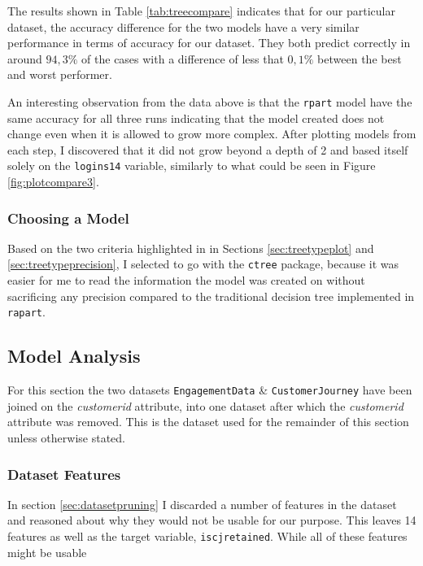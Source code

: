 The results shown in Table \ref{tab:treecompare} indicates that for our
particular dataset, the accuracy difference for the two models have a very
similar performance in terms of accuracy for our dataset. They both predict
correctly in around $94,3\%$ of the cases with a difference of less that
$0,1\%$ between the best and worst performer.

An interesting observation from the data above is that the \texttt{rpart} model
have the same accuracy for all three runs indicating that the model created does
not change even when it is allowed to grow more complex. After plotting models
from each step, I discovered that it did not grow beyond a depth of 2 and based
itself solely on the \texttt{logins14} variable, similarly to what could be seen
in Figure \ref{fig:plotcompare3}.


\subsubsection{Choosing a Model}

Based on the two criteria highlighted in in Sections \ref{sec:treetypeplot} and
\ref{sec:treetypeprecision}, I selected to go with the \texttt{ctree} package,
because it was easier for me to read the information the model was created on
without sacrificing any precision compared to the traditional decision tree
implemented in \texttt{rapart}.


\subsection{Model Analysis}

For this section the two datasets \texttt{EngagementData} \&
\texttt{CustomerJourney} have been joined on the \textit{customerid} attribute,
into one dataset after which the \textit{customerid} attribute was removed. This
is the dataset used for the remainder of this section unless otherwise stated.


\subsubsection{Dataset Features}

In section \ref{sec:datasetpruning} I discarded a number of features in the
dataset and reasoned about why they would not be usable for our purpose. This
leaves 14 features as well as the target variable, \texttt{iscjretained}. While
all of these features might be usable


